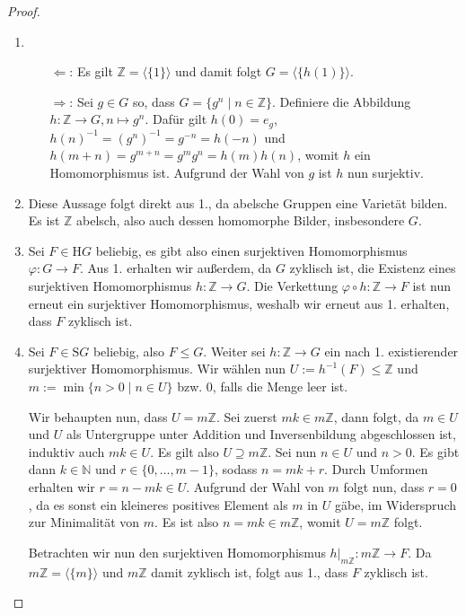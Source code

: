 \begin{proof} {\ }
    \begin{enumerate}
        \item \begin{itemize}
            \item[$\Leftarrow$:] Es gilt $\mathbb{Z}=\langle \{1\} \rangle$ und damit folgt $G=\langle \{h(1)\} \rangle$.
            \item[$\Rightarrow$:] Sei $g \in G$ so, dass $G = \{g^n \mid n \in \mathbb{Z}\} $. Definiere die Abbildung $h: \mathbb{Z} \to G, n \mapsto g^n$. Dafür gilt $h(0) = e_g$, $h(n)^{-1} = (g^{n})^{-1} = g^{-n} = h(-n)$ und $h(m+n) = g^{m+n} = g^m g^n = h(m)h(n)$, womit $h$ ein Homomorphismus ist. Aufgrund der Wahl von $g$ ist $h$ nun surjektiv.
        \end{itemize}
        \item Diese Aussage folgt direkt aus 1., da abelsche Gruppen eine Varietät bilden. Es ist $\mathbb{Z}$ abelsch, also auch dessen homomorphe Bilder, insbesondere $G$.
        \item Sei $F \in \mathrm{H}G$ beliebig, es gibt also einen surjektiven Homomorphismus $\varphi: G \to F$. Aus 1. erhalten wir außerdem, da $G$ zyklisch ist, die Existenz eines surjektiven Homomorphismus $h: \mathbb{Z} \to G$. Die Verkettung $\varphi \circ h: \mathbb{Z} \to F$ ist nun erneut ein surjektiver Homomorphismus, weshalb wir erneut aus 1. erhalten, dass $F$ zyklisch ist.
        \item Sei $F \in \mathrm{S}G$ beliebig, also $F \le G$. Weiter sei $h: \mathbb{Z} \to G$ ein nach 1. existierender surjektiver Homomorphismus.
        Wir wählen nun $U := h^{-1}(F) \le \mathbb{Z}$ und $m := \min\{n > 0 \mid n \in U\}$ bzw. $0$, falls die Menge leer ist. 
        
        Wir behaupten nun, dass $U = m \mathbb{Z}$. Sei zuerst $mk \in m\mathbb{Z}$, dann folgt, da $m \in U$ und $U$ als Untergruppe unter Addition und Inversenbildung abgeschlossen ist, induktiv auch $mk \in U$. Es gilt also $U \supseteq m\mathbb{Z}$. Sei nun $n \in U$ und \obda $n > 0$. Es gibt dann $k \in \mathbb{N}$ und $r \in \{0, \ldots, m-1\}$, sodass $n = mk+r$. Durch Umformen erhalten wir $r = n - mk \in U$. Aufgrund der Wahl von $m$ folgt nun, dass $r = 0$, da es sonst ein kleineres positives Element als $m$ in $U$ gäbe, im Widerspruch zur Minimalität von $m$. Es ist also $n = mk \in m\mathbb{Z}$, womit $U = m\mathbb{Z}$ folgt.

        Betrachten wir nun den surjektiven Homomorphismus $h\vert_{m\mathbb{Z}}: m\mathbb{Z} \to F$. Da $m\mathbb{Z} = \langle\{m\}\rangle$ und $m\mathbb{Z}$ damit zyklisch ist, folgt aus 1., dass $F$ zyklisch ist.
    \end{enumerate}
\end{proof}

